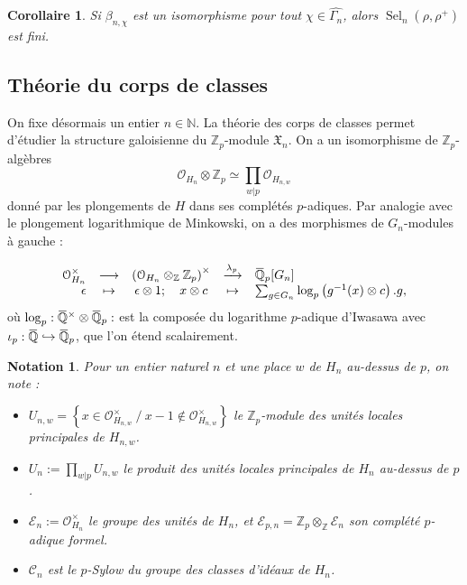 \documentclass[12pt]{amsart}
\newcommand\bN{\mathbb{N}}
\newcommand\bZ{\mathbb{Z}}
\newcommand\bQ{\mathbb{Q}}
\newcommand\Zp{{\mathbb{Z}_{p}}}
\newcommand\cC{\mathcal{C}}
\newcommand\cE{\mathcal{E}}
\newcommand\cO{\mathcal{O}}
\newcommand\gX{\mathfrak{X}}
\newcommand{\ob}[1]{\mkern 1.5mu\overline{\mkern-1.5mu#1\mkern-1.5mu}\mkern 1.5mu}
\DeclareMathOperator{\Sel}{Sel}
\theoremstyle{defstyle}
\newtheorem{notation}[subsubsection]{Notation}
\theoremstyle{thmstyle}
\newtheorem{corollaire}[subsubsection]{Corollaire}
\begin{document}
\begin{corollaire}\label{coro:beta_n_chi_isom?}
	Si $\beta_{n,\chi}$ est un isomorphisme pour tout $\chi \in \widehat{\Gamma_n}$, alors $\Sel_n(\rho,\rho^+)$ est fini.
\end{corollaire}

\subsection{Théorie du corps de classes}\label{sec:TCC}

On fixe désormais un entier $n\in\bN$. La théorie des corps de classes permet d'étudier la structure galoisienne du $\Zp$-module $\gX_n$. On a un isomorphisme de $\Zp$-algèbres 
\begin{equation}\label{eq:completes_p_adiques}
\cO_{H_n} \otimes \Zp \simeq \prod_{w|p} \cO_{H_{n,w}}
\end{equation}
donné par les plongements de $H$ dans ses complétés $p$-adiques. Par analogie avec le plongement logarithmique de Minkowski, on a des morphismes de $G_n$-modules à gauche : 

\begin{equation}\label{eq:plongement_log_p}
\begin{array}{rcccl} 
\cO_{H_n}^\times & \longrightarrow & \left(\cO_{H_n} \otimes_\bZ \Zp\right)^{\times} & \xrightarrow{\lambda_p} & \ob{\bQ}_p[G_n] \\ 
\epsilon & \mapsto & \epsilon \otimes 1 ; \quad x \otimes c & \mapsto & \sum_{g\in G_n} \log_p\left(g^{-1}(x) \otimes c\right).g,
\end{array}
\end{equation}
où $\log_p : \ob{\bQ}^\times \otimes \ob{\bQ}_p : $ est la composée du logarithme $p$-adique d'Iwasawa avec $\iota_p : \ob{\bQ} \hookrightarrow \ob{\bQ}_p$, que l'on étend scalairement.

\begin{notation}
	Pour un entier naturel $n$ et une place $w$ de $H_n$ au-dessus de $p$, on note :
	\begin{itemize}
		\item $U_{n,w}=\left\{ x \in \cO_{H_{n,w}}^\times \ /\ x-1 \notin \cO_{H_{n,w}}^\times \right\}$ le $\Zp$-module des unités locales principales de $H_{n,w}$.
		\item $U_n:= \prod_{w|p}U_{n,w}$ le produit des unités locales principales de $H_n$ au-dessus de $p$. 
		\item $\cE_{n}:= \cO_{H_n}^\times$ le groupe des unités de $H_n$, et $\cE_{p,n}=\Zp \otimes_\bZ \cE_n$ son complété $p$-adique formel. 
		\item $\cC_n$ est le $p$-Sylow du groupe des classes d'idéaux de $H_n$.
	\end{itemize}
\end{notation}
\end{document}
